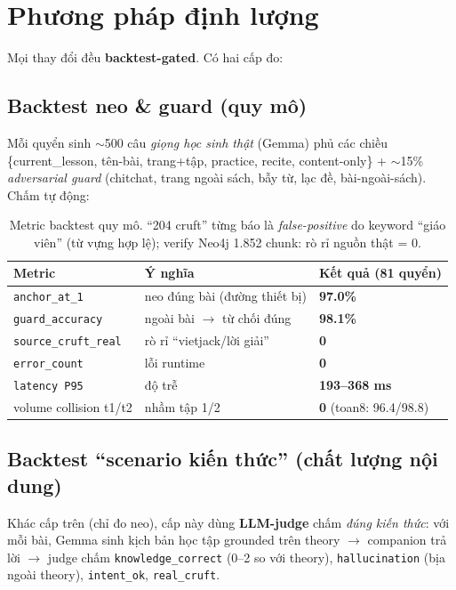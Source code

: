 \documentclass[11pt,a4paper]{article}
\newcommand{\metric}[1]{{\sffamily\bfseries\color{cprim}#1}}
\begin{document}
\section{Phương pháp định lượng}
\label{sec:quant}
Mọi thay đổi đều \textbf{backtest-gated}. Có hai cấp đo:

\subsection{Backtest neo \& guard (quy mô)}
Mỗi quyển sinh $\sim$500 câu \emph{giọng học sinh thật} (Gemma) phủ các chiều
\{current\_lesson, tên-bài, trang+tập, practice, recite, content-only\} + $\sim$15\% \emph{adversarial guard}
(chitchat, trang ngoài sách, bẫy từ, lạc đề, bài-ngoài-sách). Chấm tự động:

\begin{table}[h]\centering\small\sffamily
\begin{tabular}{lll}
\toprule
\textbf{Metric} & \textbf{Ý nghĩa} & \textbf{Kết quả (81 quyển)}\\
\midrule
\texttt{anchor\_at\_1} & neo đúng bài (đường thiết bị) & \metric{97.0\%}\\
\texttt{guard\_accuracy} & ngoài bài $\to$ từ chối đúng & \metric{98.1\%}\\
\texttt{source\_cruft\_real} & rò rỉ ``vietjack/lời giải'' & \metric{0}\\
\texttt{error\_count} & lỗi runtime & \metric{0}\\
\texttt{latency P95} & độ trễ & \metric{193--368 ms}\\
volume collision t1/t2 & nhầm tập 1/2 & \metric{0} (toan8: 96.4/98.8)\\
\bottomrule
\end{tabular}
\caption{Metric backtest quy mô. ``204 cruft'' từng báo là \emph{false-positive} do keyword
``giáo viên'' (từ vựng hợp lệ); verify Neo4j 1.852 chunk: rò rỉ nguồn thật = 0.}
\end{table}

\subsection{Backtest ``scenario kiến thức'' (chất lượng nội dung)}
Khác cấp trên (chỉ đo neo), cấp này dùng \textbf{LLM-judge} chấm \emph{đúng kiến thức}: với mỗi bài,
Gemma sinh kịch bản học tập grounded trên theory $\to$ companion trả lời $\to$ judge chấm
\texttt{knowledge\_correct} (0--2 so với theory), \texttt{hallucination} (bịa ngoài theory),
\texttt{intent\_ok}, \texttt{real\_cruft}.
\end{document}
